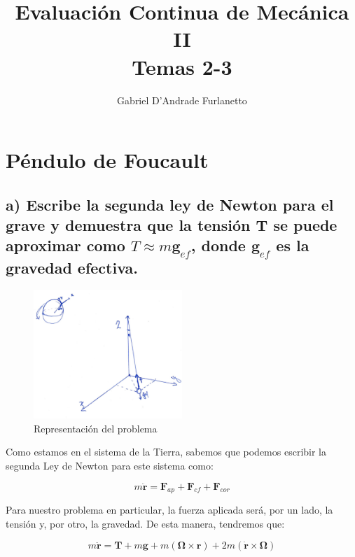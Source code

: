 \documentclass[a4paper,12pt]{article}
\begin{document}
\title{Evaluación Continua de Mecánica II\\ Temas 2-3}
\author{Gabriel D'Andrade Furlanetto}
\maketitle 

\section{Péndulo de Foucault}

\subsection*{a) Escribe la segunda ley de Newton para el grave y demuestra que la tensión $\boldsymbol{T}$ se puede aproximar como $T \approx m\boldsymbol{g}_{ef}$, donde $\boldsymbol{g}_{ef}$ es la gravedad efectiva.}

\begin{figure}[H]
  \centering
  \includegraphics[width=0.5\textwidth]{foucault.jpg}
  \caption{Representación del problema}
  \label{fucas}
\end{figure}


Como estamos en el sistema de la Tierra, sabemos que podemos escribir la segunda Ley de Newton para este sistema como:

\begin{equation}
  m\ddot{\boldsymbol{r}} = \boldsymbol{F}_{ap} + \boldsymbol{F}_{cf} + \boldsymbol{F}_{cor}
\end{equation}

Para nuestro problema en particular, la fuerza aplicada será, por un lado, la tensión y, por otro, la gravedad. De esta manera, tendremos que:

\begin{equation}
  m \ddot{\boldsymbol{r}} = \boldsymbol{T} + m\boldsymbol{g} + m(\boldsymbol{\Omega} \times \boldsymbol{r}) + 2m (\dot{\boldsymbol{r}} \times \boldsymbol{\Omega})
\end{equation}
\end{document}

